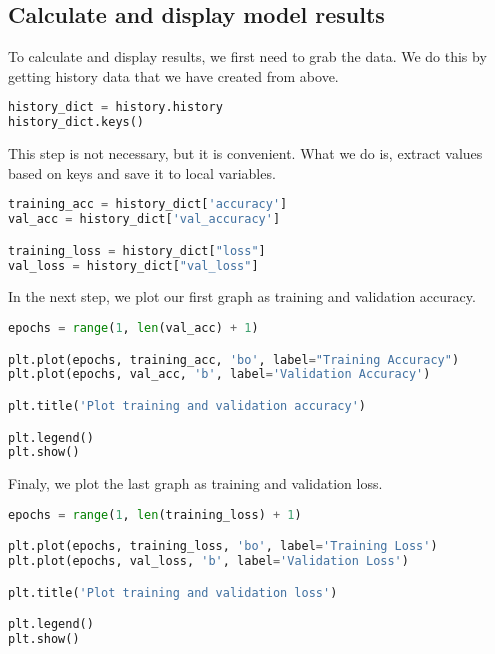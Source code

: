\subsection{Calculate and display model results}
To calculate and display results, we first need to grab the data. We do this by getting history data that we have created from above.
\begin{lstlisting}[language=Python, caption=Create dictionary of history values]
history_dict = history.history
history_dict.keys()
\end{lstlisting}
This step is not necessary, but it is convenient. What we do is, extract values based on keys and save it to local variables.
\begin{lstlisting}[language=Python, caption=Save data from dict to local variables]
training_acc = history_dict['accuracy']
val_acc = history_dict['val_accuracy']

training_loss = history_dict["loss"]
val_loss = history_dict["val_loss"]
\end{lstlisting}
In the next step, we plot our first graph as training and validation accuracy.
\begin{lstlisting}[language=Python, caption=Plot training and validation accuracy]
epochs = range(1, len(val_acc) + 1)

plt.plot(epochs, training_acc, 'bo', label="Training Accuracy")
plt.plot(epochs, val_acc, 'b', label='Validation Accuracy')

plt.title('Plot training and validation accuracy')

plt.legend()
plt.show()
\end{lstlisting}
Finaly, we plot the last graph as training and validation loss.
\begin{lstlisting}[language=Python, caption=Plot training and validation loss]
epochs = range(1, len(training_loss) + 1)

plt.plot(epochs, training_loss, 'bo', label='Training Loss')
plt.plot(epochs, val_loss, 'b', label='Validation Loss')

plt.title('Plot training and validation loss')

plt.legend()
plt.show()
\end{lstlisting}